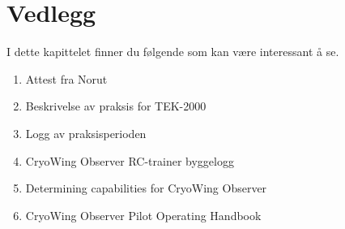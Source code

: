 \documentclass[12pt, a4paper]{article}
\begin{document}
\section{Vedlegg}
I dette kapittelet finner du følgende som kan være interessant å se.\\

\begin{enumerate}
	\item Attest fra Norut
	\item Beskrivelse av praksis for TEK-2000
	\item Logg av praksisperioden
	\item CryoWing Observer RC-trainer byggelogg
	\item Determining capabilities for CryoWing Observer
		\item CryoWing Observer Pilot Operating Handbook
\end{enumerate}






\end{document}

